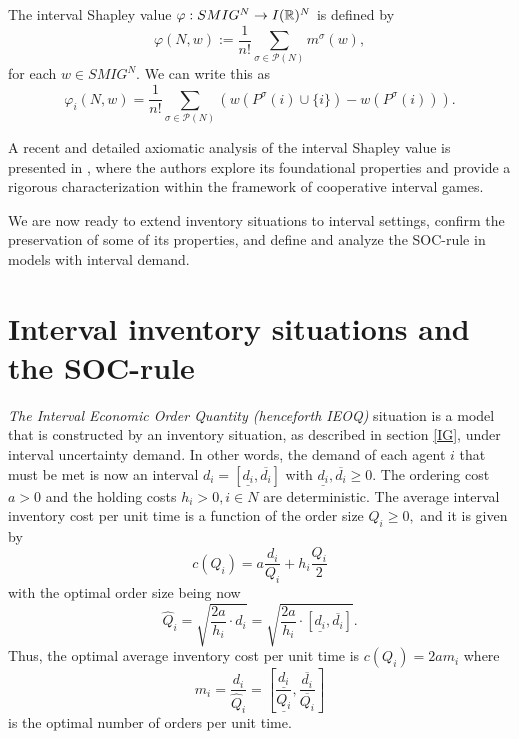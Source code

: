\documentclass[12pt]{article}
\begin{document}
\noindent The interval Shapley value $\varphi :SMIG^{N}\rightarrow I(\mathbb{%
R})^{N}$ is defined by  
\begin{equation*}
\varphi \left( N,w\right) :=\frac{1}{n!}\sum_{\sigma \in \mathcal{P}%
(N)}m^{\sigma }(w),
\end{equation*}%
for each $w\in SMIG^{N}.$ We can write this as  
\begin{equation*}
\varphi _{i}\left( N,w\right) =\frac{1}{n!}\sum_{\sigma \in \mathcal{P}%
(N)}\left( w(P^{\sigma }(i)\cup \{i\})-w(P^{\sigma }(i))\right) .
\end{equation*}%

A recent and detailed axiomatic analysis of the interval Shapley value is presented in \cite{Ishihara2023}, where the authors explore its foundational properties and provide a rigorous characterization within the framework of cooperative interval games.

\noindent We are now ready to extend inventory situations to interval settings, confirm the preservation of some of its properties, and define and analyze the SOC-rule in models with interval demand.

\section{Interval inventory situations and the SOC-rule}\label{sec:3}  

\noindent\textit{The Interval Economic Order Quantity (henceforth IEOQ)} situation is a model that is constructed by an inventory situation, as described in section \ref{IG}, under interval uncertainty demand. In other words, the demand of each agent $i$ that must be met is now an interval $d_{i} =\left[ \underline{d_{i}},\overline{d_{i}}\right]$ with $\underline{d_{i}},\overline{d_{i}}\geq 0.$ The ordering cost $a>0$ and the holding costs $h_{i}>0, i \in N$ are deterministic. The average interval inventory cost per unit time is a function of the order size $Q_{i} \geq 0,$ and it is given by %
\begin{equation*}
c\left( Q_{i}\right) =a\dfrac{d_{i}}{Q_{i}}+h_{i}\dfrac{Q_{i}}{2}
\end{equation*}%
with the optimal order size being now  
\begin{equation*}
\widehat{Q}_{i}=\sqrt{\frac{2a}{h_{i}}\cdot d_{i}}=\sqrt{\frac{2a}{h_{i}}%
\cdot \left[ \underline{d_{i}},\overline{d_{i}}\right] }.
\end{equation*}%
\noindent Thus, the optimal average inventory cost per unit time is $%
c(Q_{i})=2am_{i}$ where 
\begin{equation*}
m_{i}=\dfrac{d_{i}}{\widehat{Q}_{i}}=\left[ \frac{\underline{d_{i}}}{\underline{Q_{i}}}
,\frac{\overline{d_{i}}}{\overline{Q_{i}}}\right]
\end{equation*}
is the optimal number of orders per unit time.
\end{document}
